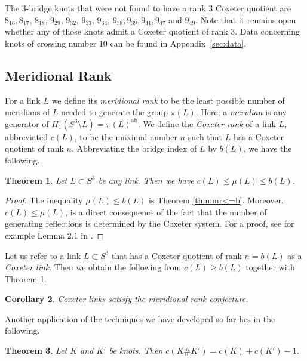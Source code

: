 \documentclass{article}
\newtheorem{theorem}{Theorem}[section]
\newtheorem{corollary}[theorem]{Corollary}
\theoremstyle{definition}
\begin{document}
The $3$-bridge knots that were not found to have a rank $3$ Coxeter quotient are $8_{16}, 8_{17}$, $8_{18}$, $9_{29}$, $9_{32}$, $9_{33}$, $9_{34}$, $9_{38}, 9_{39}, 9_{41}, 9_{47}$ and $9_{49}$. Note that it remains open whether any of those knots admit a Coxeter quotient of rank $3$.
Data concerning knots of crossing number $10$ can be found in Appendix~\ref{sec:data}.

\subsection{Meridional Rank}\label{subsec:meridional-rank}
For a link $L$ we define its \textit{meridional rank} to be the least possible number of meridians of $L$ needed to generate the group $\pi(L)$. Here, a \textit{meridian} is any generator of $H_1(S^3 \setminus L) = \pi(L)^{\text{ab}}$.
We define the \textit{Coxeter rank} of a link $L$, abbreviated $c (L)$, to be the maximal number $n$ such that $L$ has a Coxeter quotient of rank $n$. Abbreviating the bridge index of $L$ by $b(L)$, we have the following.

\begin{theorem}\label{thm:c<=mu<=b}
Let $L \subset S^3$ be any link. Then we have $c(L) \leq \mu(L) \leq b(L)$.
\end{theorem}

\begin{proof}
The inequality $\mu( L ) \leq b(L)$ is Theorem \ref{thm:mr<=b}. Moreover, $c (L) \leq \mu( L )$, is a direct consequence of the fact that the number of generating reflections is determined by the Coxeter system. For a proof, see for example Lemma 2.1 in \cite{felikson2009}.
\end{proof}

Let us refer to a link $L \subset S^3$ that has a Coxeter quotient of rank $n = b(L)$ as a \textit{Coxeter link}. Then we obtain the following from $c(L) \geq b(L)$ together with Theorem \ref{thm:c<=mu<=b}.

\begin{corollary}\label{cor:coxeter-links-meridional-rank}
Coxeter links satisfy the meridional rank conjecture.
\end{corollary}

Another application of the techniques we have developed so far lies in the following.

\begin{theorem}\label{thm:connected-sums-coxeter-rank}
Let $K$ and $K'$ be knots. Then $c (K\#K') = c (K) + c (K') - 1$.
\end{theorem}
\end{document}

